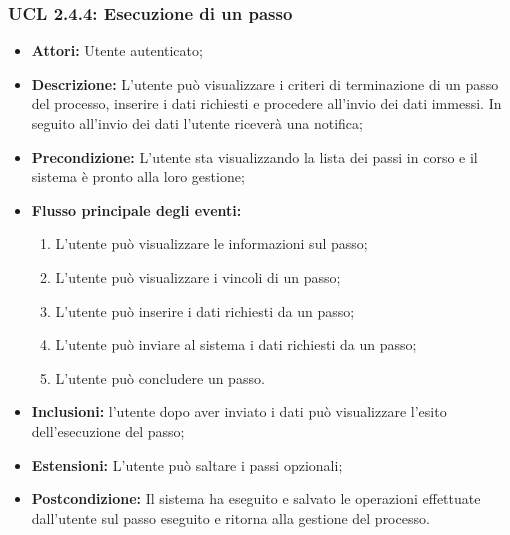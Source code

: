 \subsubsection{UCL 2.4.4: Esecuzione di un passo}
\begin{itemize}
\item \textbf{Attori:} Utente autenticato;
\item \textbf{Descrizione:} L'utente può visualizzare i criteri di terminazione di un passo del processo, inserire i dati richiesti e procedere all'invio dei dati immessi. In seguito all'invio dei dati l'utente riceverà una notifica;
\item \textbf{Precondizione:} L'utente sta visualizzando la lista dei passi in corso e il sistema è pronto alla loro gestione;
\item \textbf{Flusso principale degli eventi:}
\begin{enumerate}
\item L'utente può visualizzare le informazioni sul passo;
\item L'utente può visualizzare i vincoli di un passo;
\item L'utente può inserire i dati richiesti da un passo;
\item L'utente può inviare al sistema i dati richiesti da un passo;
\item L'utente può concludere un passo.
\end{enumerate}
\item \textbf{Inclusioni:} l'utente dopo aver inviato i dati può visualizzare l'esito dell'esecuzione del passo;
\item \textbf{Estensioni:} L'utente può saltare i passi opzionali;
\item \textbf{Postcondizione:} Il sistema ha eseguito e salvato le operazioni effettuate dall'utente sul passo eseguito e ritorna alla gestione del processo.
\end{itemize}

\hypertarget{L2.4.4.1}{}
